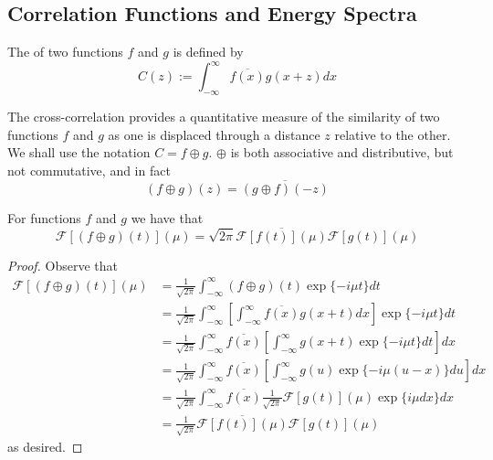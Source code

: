 \documentclass[12pt, a4paper, oneside, openright, titlepage]{book}
\begin{document}
\subsection{Correlation Functions and Energy Spectra}

\begin{defn}
    The  of two functions $f$ and $g$ is defined by \begin{equation}
        C(z) := \int_{-\infty}^{\infty}\overline{f(x)}g(x+z)dx
    \end{equation}
\end{defn}

The cross-correlation provides a quantitative measure of the similarity of two functions $f$ and $g$ as one is displaced through a distance $z$ relative to the other. We shall use the notation $C = f\oplus g$. $\oplus$ is both associative and distributive, but not commutative, and in fact \begin{equation}
    (f\oplus g)(z) = \overline{(g\oplus f)(-z)}
\end{equation}


\begin{thm}
    For functions $f$ and $g$ we have that \begin{equation*}
        \mathcal{F}[(f\oplus g)(t)](\mu) = \sqrt{2\pi}\overline{\mathcal{F}[f(t)](\mu)}\mathcal{F}[g(t)](\mu)
    \end{equation*}
\end{thm}

\begin{proof}
    Observe that \begin{align*}
        \mathcal{F}[(f\oplus g)(t)](\mu) &= \frac{1}{\sqrt{2\pi}}\int_{-\infty}^{\infty}(f\oplus g)(t)\exp\{-i\mu t\}dt \\
        &= \frac{1}{\sqrt{2\pi}}\int_{-\infty}^{\infty}\left[\int_{-\infty}^{\infty}\overline{f(x)}g(x+t)dx\right]\exp\{-i\mu t\}dt \\
        &= \frac{1}{\sqrt{2\pi}}\int_{-\infty}^{\infty}\overline{f(x)}\left[\int_{-\infty}^{\infty}g(x+t)\exp\{-i\mu t\}dt\right]dx \\
        &= \frac{1}{\sqrt{2\pi}}\int_{-\infty}^{\infty}\overline{f(x)}\left[\int_{-\infty}^{\infty}g(u)\exp\{-i\mu (u-x)\}du\right]dx \\
        &= \frac{1}{\sqrt{2\pi}}\int_{-\infty}^{\infty}\overline{f(x)}\frac{1}{\sqrt{2\pi}}\mathcal{F}[g(t)](\mu)\exp\{i\mu dx\}dx \\
        &= \frac{1}{\sqrt{2\pi}}\overline{\mathcal{F}[f(t)](\mu)}\mathcal{F}[g(t)](\mu)
    \end{align*}
    as desired.
\end{proof}
\end{document}
